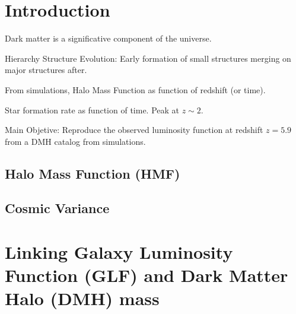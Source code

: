 \section{Introduction}

Dark matter is a significative component of the universe.

\citep{trimble87}

Hierarchy Structure Evolution: Early formation of small structures
merging on major structures after.

From simulations, Halo Mass Function as function of redshift (or time).

Star formation rate as function of time. Peak at $z\sim 2$.

Main Objetive: Reproduce the observed luminosity function at redshift $z=5.9$
from a DMH catalog from simulations. 

  \subsection{Halo Mass Function (HMF)}
  
  
  
  \subsection{Cosmic Variance}
  

\section{Linking Galaxy Luminosity Function (GLF) and
  Dark Matter Halo (DMH) mass}




